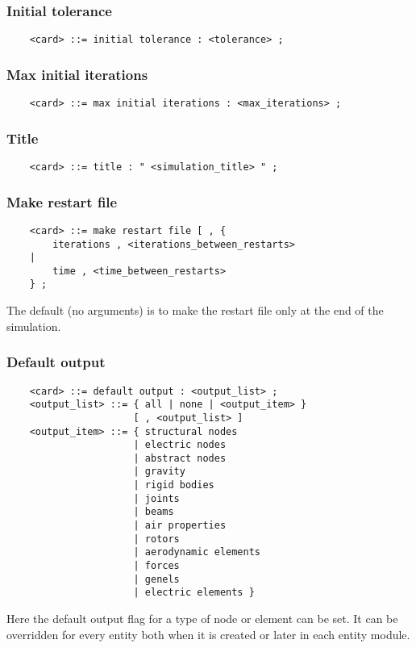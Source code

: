 \subsubsection{Initial tolerance}
\begin{verbatim}
    <card> ::= initial tolerance : <tolerance> ;
\end{verbatim}

\subsubsection{Max initial iterations}
\begin{verbatim}
    <card> ::= max initial iterations : <max_iterations> ;
\end{verbatim}

\subsubsection{Title}
\begin{verbatim}
    <card> ::= title : " <simulation_title> " ;
\end{verbatim}

\subsubsection{Make restart file}
\begin{verbatim}
    <card> ::= make restart file [ , {
        iterations , <iterations_between_restarts>
    |
        time , <time_between_restarts>
    } ;    
\end{verbatim}
The default (no arguments) is to make the restart file only at the end of
the simulation.

\subsubsection{Default output}
\begin{verbatim}
    <card> ::= default output : <output_list> ;
    <output_list> ::= { all | none | <output_item> } 
                      [ , <output_list> ]
    <output_item> ::= { structural nodes
                      | electric nodes
                      | abstract nodes
                      | gravity
                      | rigid bodies
                      | joints
                      | beams
                      | air properties
                      | rotors
                      | aerodynamic elements
                      | forces
                      | genels
                      | electric elements }
\end{verbatim}
Here the default output flag for a type of node or element can be set. It
can be overridden for every entity both when it is created or later in
each entity module.

